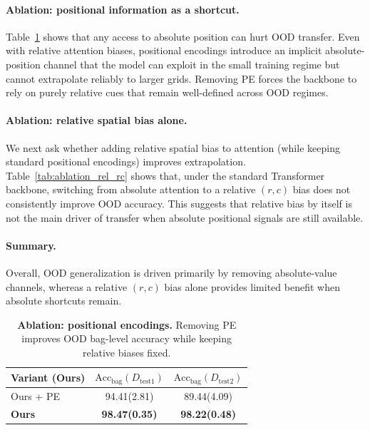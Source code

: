 \documentclass{article}
\theoremstyle{plain}
\theoremstyle{definition}
\theoremstyle{remark}
\begin{document}
\paragraph{Ablation: positional information as a shortcut.}
Table~\ref{tab:ablation_pe_hurt_ours} shows that any access to absolute position can hurt OOD transfer.
Even with relative attention biases, positional encodings introduce an implicit absolute-position channel that the model can exploit in the small training regime but cannot extrapolate reliably to larger grids.
Removing PE forces the backbone to rely on purely relative cues that remain well-defined across OOD regimes.



\paragraph{Ablation: relative spatial bias alone.}
We next ask whether adding relative spatial bias to attention (while keeping standard positional encodings) improves extrapolation.
Table~\ref{tab:ablation_rel_rc} shows that, under the standard Transformer backbone, switching from absolute attention to a relative $(r,c)$ bias does not consistently improve OOD accuracy.
This suggests that relative bias by itself is not the main driver of transfer when absolute positional signals are still available.


\paragraph{Summary.}
Overall, OOD generalization is driven primarily by removing absolute-value channels, whereas a relative $(r,c)$ bias alone provides limited benefit when absolute shortcuts remain.



\begin{table}[t]
	\centering
\caption{\textbf{Ablation: positional encodings.}
Removing PE improves OOD bag-level accuracy while keeping relative biases fixed.}
	\label{tab:ablation_pe_hurt_ours}
	\begin{tabular}{lcc}
		\toprule
		\textbf{Variant (Ours)} &
		$\mathrm{Acc}_{\text{bag}}(D_{\text{test1}})$ &
		$\mathrm{Acc}_{\text{bag}}(D_{\text{test2}})$ \\
		\midrule
		Ours + PE & 94.41(2.81) & 89.44(4.09) \\
		\textbf{Ours} & \textbf{98.47(0.35)} & \textbf{98.22(0.48)} \\
		\bottomrule
	\end{tabular}
\end{table}
\end{document}
